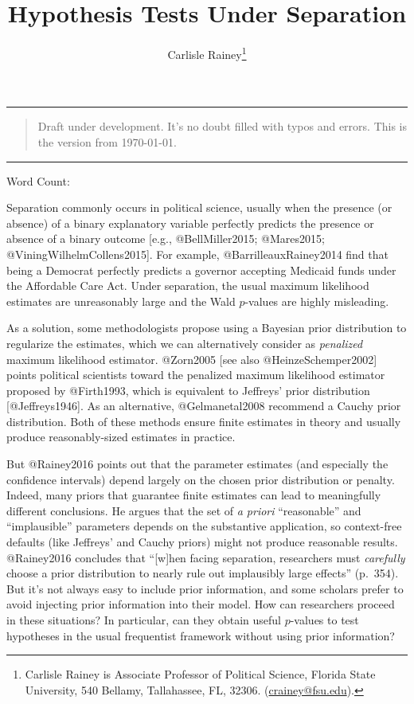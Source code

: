 \documentclass[
]{article}
\title{Hypothesis Tests Under Separation}
\author{Carlisle Rainey\footnote{Carlisle Rainey is Associate Professor
  of Political Science, Florida State University, 540 Bellamy,
  Tallahassee, FL, 32306.
  (\href{mailto:crainey@fsu.edu}{crainey@fsu.edu}).}}
\date{}
\begin{document}
\maketitle

\begin{center}\rule{0.5\linewidth}{0.5pt}\end{center}

\begin{quote}
Draft under development. It's no doubt filled with typos and errors. This is the version from \today.
\end{quote}

\begin{center}\rule{0.5\linewidth}{0.5pt}\end{center}

\begin{center}
Word Count:  
\end{center}

Separation commonly occurs in political science, usually when the
presence (or absence) of a binary explanatory variable perfectly
predicts the presence or absence of a binary outcome {[}e.g.,
@BellMiller2015; @Mares2015; @ViningWilhelmCollens2015{]}. For example,
@BarrilleauxRainey2014 find that being a Democrat perfectly predicts a
governor accepting Medicaid funds under the Affordable Care Act. Under
separation, the usual maximum likelihood estimates are unreasonably
large and the Wald \(p\)-values are highly misleading.

As a solution, some methodologists propose using a Bayesian prior
distribution to regularize the estimates, which we can alternatively
consider as \emph{penalized} maximum likelihood estimator. @Zorn2005
{[}see also @HeinzeSchemper2002{]} points political scientists toward
the penalized maximum likelihood estimator proposed by @Firth1993, which
is equivalent to Jeffreys' prior distribution {[}@Jeffreys1946{]}. As an
alternative, @Gelmanetal2008 recommend a Cauchy prior distribution. Both
of these methods ensure finite estimates in theory and usually produce
reasonably-sized estimates in practice.

But @Rainey2016 points out that the parameter estimates (and especially
the confidence intervals) depend largely on the chosen prior
distribution or penalty. Indeed, many priors that guarantee finite
estimates can lead to meaningfully different conclusions. He argues that
the set of \emph{a priori} ``reasonable'' and ``implausible'' parameters
depends on the substantive application, so context-free defaults (like
Jeffreys' and Cauchy priors) might not produce reasonable results.
@Rainey2016 concludes that ``{[}w{]}hen facing separation, researchers
must \emph{carefully} choose a prior distribution to nearly rule out
implausibly large effects'' (p.~354). But it's not always easy to
include prior information, and some scholars prefer to avoid injecting
prior information into their model. How can researchers proceed in these
situations? In particular, can they obtain useful \(p\)-values to test
hypotheses in the usual frequentist framework without using prior
information?
\end{document}
